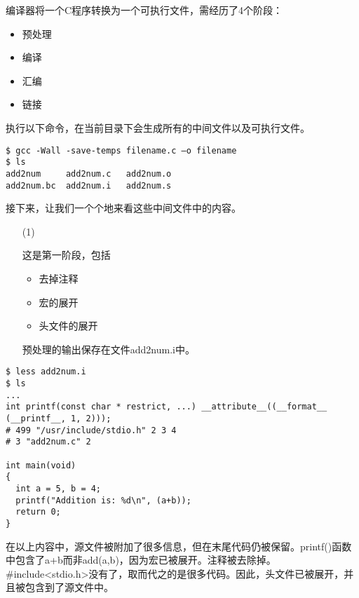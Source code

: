 \begin{frame}[fragile]\ft{\secname}
编译器将一个C程序转换为一个可执行文件，需经历了4个阶段：
\begin{itemize}
\item 预处理
\item 编译
\item 汇编
\item 链接
\end{itemize}
\end{frame}


\begin{frame}[fragile]\ft{\secname}
执行以下命令，在当前目录下会生成所有的中间文件以及可执行文件。
\begin{lstlisting}[backgroundcolor=\color{red!10}]
$ gcc -Wall -save-temps filename.c –o filename 
$ ls 
add2num     add2num.c   add2num.o
add2num.bc  add2num.i   add2num.s
\end{lstlisting}
\end{frame}


\begin{frame}[fragile]\ft{\secname}
接下来，让我们一个个地来看这些中间文件中的内容。
\begin{itemize}
\item[(1)] 
\item[] 这是第一阶段，包括
\begin{itemize}
\item 去掉注释
\item 宏的展开
\item 头文件的展开
\end{itemize}
预处理的输出保存在文件add2num.i中。
\end{itemize}
\end{frame}


\begin{frame}[fragile]\ft{\secname}
\begin{lstlisting}[basicstyle=\ttfamily\footnotesize,backgroundcolor=\color{red!10}]
$ less add2num.i
$ ls 
...
int printf(const char * restrict, ...) __attribute__((__format__ (__printf__, 1, 2)));
# 499 "/usr/include/stdio.h" 2 3 4
# 3 "add2num.c" 2

int main(void)
{
  int a = 5, b = 4;
  printf("Addition is: %d\n", (a+b));
  return 0;
}
\end{lstlisting}
\end{frame}


\begin{frame}[fragile]\ft{\secname}
在以上内容中，源文件被附加了很多信息，但在末尾代码仍被保留。{\ttfamily printf()}函数中包含了{\ttfamily a+b}而非{\ttfamily add(a,b)}，因为宏已被展开。注释被去除掉。{\ttfamily\#include<stdio.h>}没有了，取而代之的是很多代码。因此，头文件已被展开，并且被包含到了源文件中。

\end{frame}


